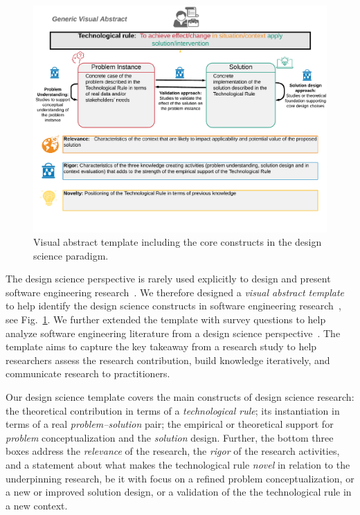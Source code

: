 \documentclass[graybox]{svmult}
\begin{document}
\begin{figure}[t]
\includegraphics[width=1.0\textwidth, trim={0 15mm 0 0},clip]{05_Runeson_DesignScience_Fig_4.pdf}
\caption{Visual abstract template including the core constructs in the design science paradigm.}
\label{fig:VA-template}      
\end{figure}


The design science perspective is rarely used explicitly to design and present software engineering research~\citep{Engstrom19arxiv}. We therefore designed a \emph{visual abstract template} to help identify the design science constructs in software engineering research~\citep{StoreyESEM17}, see Fig.~\ref{fig:VA-template}. We further extended the template with survey questions to help analyze software engineering literature from a design science perspective~\citep{Engstrom19arxiv}. The template aims to capture the key takeaway from a research study to help researchers assess the research contribution, build knowledge iteratively, and communicate research to practitioners. %

Our design science template covers the main constructs of design science research: the theoretical contribution in terms of a \emph{technological rule}; its instantiation in terms of a real \emph{problem--solution} pair; the empirical or theoretical support for \emph{problem} conceptualization and the \emph{solution} design. Further, the bottom three boxes address the \emph{relevance} of the research, the \emph{rigor} of the research activities, and a statement about what makes the technological rule \emph{novel} in relation to the underpinning research, be it with focus on a refined problem conceptualization, or a new or improved solution design, or a validation of the the technological rule in a new context. 
\end{document}
